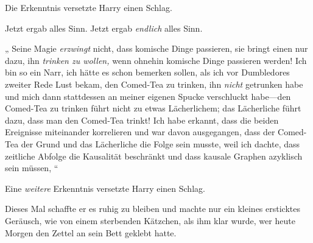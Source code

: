 Die Erkenntnis versetzte Harry einen Schlag.

Jetzt ergab alles Sinn. Jetzt ergab \emph{endlich} alles Sinn.

„ Seine Magie \emph{erzwingt} nicht, dass komische Dinge passieren, sie bringt einen nur dazu, ihn \emph{trinken zu wollen,} wenn ohnehin komische Dinge passieren werden! Ich bin so ein Narr, ich hätte es schon bemerken sollen, als ich vor Dumbledores zweiter Rede Lust bekam, den Comed-Tea zu trinken, ihn \emph{nicht} getrunken habe und mich dann stattdessen an meiner eigenen Spucke verschluckt habe—den Comed-Tea zu trinken führt nicht zu etwas Lächerlichem; das Lächerliche führt dazu, dass man den Comed-Tea trinkt! Ich habe erkannt, dass die beiden Ereignisse miteinander korrelieren und war davon ausgegangen, dass der Comed-Tea der Grund und das Lächerliche die Folge sein musste, weil ich dachte, dass zeitliche Abfolge die Kausalität beschränkt und dass kausale Graphen azyklisch sein müssen, “

Eine \emph{weitere} Erkenntnis versetzte Harry einen Schlag.

Dieses Mal schaffte er es ruhig zu bleiben und machte nur ein kleines ersticktes Geräusch, wie von einem sterbenden Kätzchen, als ihm klar wurde, wer heute Morgen den Zettel an sein Bett geklebt hatte.

